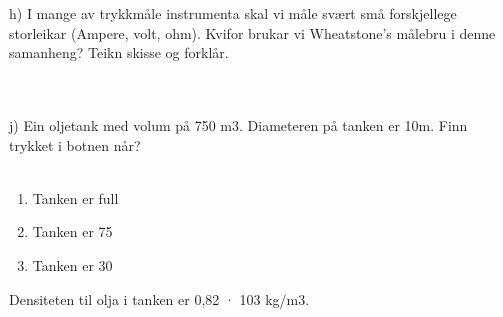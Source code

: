 \eject
h) I mange av trykkmåle instrumenta skal vi måle svært små forskjellege storleikar (Ampere, volt, ohm). Kvifor brukar vi Wheatstone’s målebru i denne samanheng? Teikn skisse og forklår. 
\\\\
\\
j) Ein oljetank med volum på 750 m3. Diameteren på tanken er 10m. Finn trykket i botnen når? 
\\\\
\begin{enumerate}


 \item Tanken er full
 \item Tanken er 75%
 \item Tanken er 30%

\end{enumerate}

Densiteten til olja i tanken er 0,82 · 103 kg/m3.
	 \\















